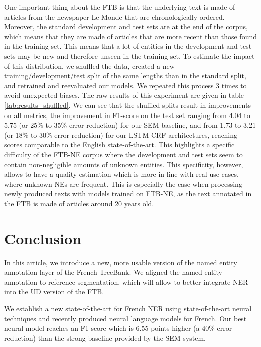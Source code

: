 One important thing about the FTB is that the underlying text is made of articles from the newspaper Le Monde that are chronologically ordered. Moreover, the standard development and test sets are at the end of the corpus, which means that they are made of articles that are more recent than those found in the training set. This means that a lot of entities in the development and test sets may be new and therefore unseen in the training set. To estimate the impact of this distribution, we shuffled the data, created a new training/development/test split of the same lengths than in the standard split, and retrained and reevaluated our models. We repeated this process 3 times to avoid unexpected biases. The raw results of this experiment are given in table \ref{tab:results_shuffled}. We can see that the shuffled splits result in improvements on all metrics, the improvement in F1-score on the test set ranging from 4.04 to 5.75 (or 25\% to 35\% error reduction) for our SEM baseline, and from 1.73 to 3.21 (or 18\% to 30\% error reduction) for our LSTM-CRF architectures, reaching scores comparable to the English state-of-the-art. This highlights a specific difficulty of the FTB-NE corpus where the development and test sets seem to contain non-negligible amounts of unknown entities. This specificity, however, allows to have a quality estimation which is more in line with real use cases, where unknown NEs are frequent. This is especially the case when processing newly produced texts with models trained on FTB-NE, as the text annotated in the FTB is made of articles around 20 years old.



\section{Conclusion}
\label{sec:conclusion}

In this article, we introduce a new, more usable version of the named entity annotation layer of the French TreeBank. We aligned the named entity annotation to reference segmentation, which will allow to better integrate NER into the UD version of the FTB.

We establish a new state-of-the-art for French NER using state-of-the-art neural techniques and recently produced neural language models for French. Our best neural model reaches an F1-score which is 6.55 points higher (a 40\% error reduction) than the strong baseline provided by the SEM system.

